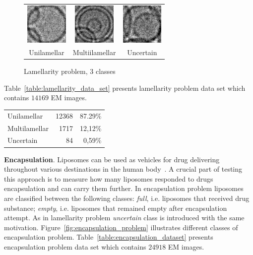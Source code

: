 \documentclass[a4paper, 11pt, table]{article}
\begin{document}
\begin{figure}[H]
\centering
\begin{tabular}{ccc}
	\includegraphics[height=2cm, keepaspectratio]{problem_description/lamellarity/uni} & \includegraphics[height=2cm, keepaspectratio]{problem_description/lamellarity/multi} & \includegraphics[height=2cm, keepaspectratio]{problem_description/lamellarity/uncertain} \\
	Unilamellar & Multiilamellar & Uncertain \\[6pt]
\end{tabular}
\caption{Lamellarity problem, 3 classes}
\label{fig:lamellarity_problem}
\end{figure}

Table~\ref{table:lamellarity_data_set} presents lamellarity problem data set which contains $\num{14169}$ EM images.

\begin{center}
\label{table:lamellarity_data_set}
\begin{tabular}{lrr}
\toprule
Unilamellar & \num{12368} & 87.29\% \\ 
Multilamellar & \num{1717} & 12,12\% \\ 
Uncertain & \num{84} & 0,59\% \\ 
\end{tabular} 
\end{center}


\textbf{Encapsulation}. Liposomes can be used as vehicles for drug delivering throughout various destinations in the human body~\cite{betageri1993liposome}. A crucial part of testing this approach is to measure how many liposomes responded to drugs encapsulation and can carry them further. In encapsulation problem liposomes are classified between the following classes: \textit{full}, i.e. liposomes that received  drug substance; \textit{empty}, i.e. liposomes that remained empty after encapsulation attempt. As in lamellarity problem \textit{uncertain} class is introduced with the same motivation. Figure~\ref{fig:encapsulation_problem} illustrates different classes of encapsulation problem. Table~\ref{table:encapsulation_dataset} presents encapsulation problem data set which contains $\num{24918}$ EM images.
\end{document}
